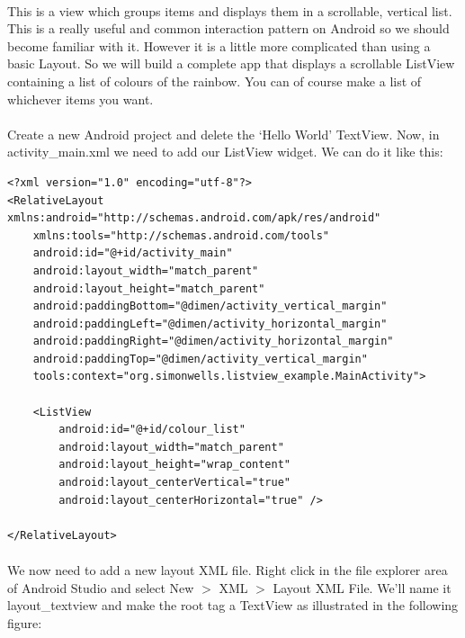 \paragraph{} This is a view which groups items and displays them in a scrollable, vertical list. This is a really useful and common interaction pattern on Android so we should become familiar with it. However it is a little more complicated than using a basic Layout. So we will build a complete app that displays a scrollable ListView containing a list of colours of the rainbow. You can of course make a list of whichever items you want.

\paragraph{} Create a new Android project and delete the `Hello World' TextView. Now, in activity\_main.xml we need to add our ListView widget. We can do it like this:

\begin{lstlisting}
<?xml version="1.0" encoding="utf-8"?>
<RelativeLayout xmlns:android="http://schemas.android.com/apk/res/android"
    xmlns:tools="http://schemas.android.com/tools"
    android:id="@+id/activity_main"
    android:layout_width="match_parent"
    android:layout_height="match_parent"
    android:paddingBottom="@dimen/activity_vertical_margin"
    android:paddingLeft="@dimen/activity_horizontal_margin"
    android:paddingRight="@dimen/activity_horizontal_margin"
    android:paddingTop="@dimen/activity_vertical_margin"
    tools:context="org.simonwells.listview_example.MainActivity">

    <ListView
        android:id="@+id/colour_list"
        android:layout_width="match_parent"
        android:layout_height="wrap_content"
        android:layout_centerVertical="true"
        android:layout_centerHorizontal="true" />

</RelativeLayout>
\end{lstlisting}

\paragraph{} We now need to add a new layout XML file. Right click in the file explorer area of Android Studio and select New $>$ XML $>$ Layout XML File. We'll name it layout\_textview and make the root tag a TextView as illustrated in the following figure: 

